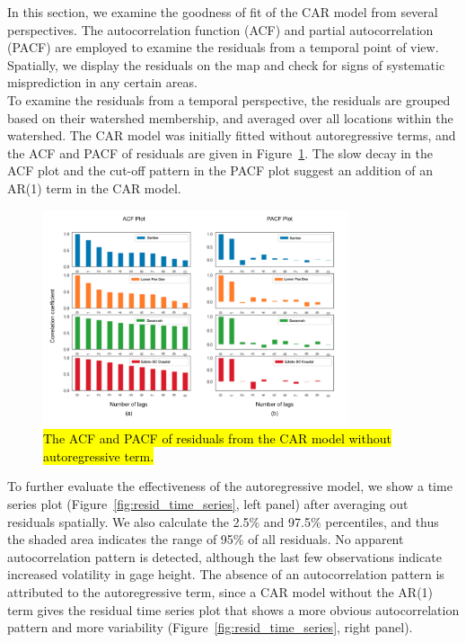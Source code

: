 In this section, we examine the goodness of fit of the CAR model from several perspectives.
The autocorrelation function (ACF) and partial autocorrelation (PACF) are employed to examine the residuals from a temporal point of view.
Spatially, we display the residuals on the map and check for signs of systematic misprediction in any certain areas.  \\

To examine the residuals from a temporal perspective, the residuals are grouped based on their watershed membership, and averaged over all locations within the watershed.
The CAR model was initially fitted without autoregressive terms, and the ACF and PACF of residuals are given in Figure~\ref{fig:ACF_and_PACF}.
The  slow decay in the ACF plot and the cut-off pattern in the PACF plot suggest an addition of an AR(1) term in the CAR model.\\

\begin{figure}[htbp]
\begin{center}
\includegraphics[width=0.8\textwidth]{../images/acf_and_pacf_for_residuals.png}
\caption{\hl{The ACF and PACF of residuals from the CAR model without autoregressive term.}}
\label{fig:ACF_and_PACF}
\end{center}
\end{figure}

To further evaluate the effectiveness of the autoregressive model, we show a time series plot (Figure~\ref{fig:resid_time_series}, left panel) after averaging out residuals spatially.
We also calculate the 2.5\% and 97.5\% percentiles, and thus the shaded area indicates the range of 95\% of all residuals.
 No apparent autocorrelation pattern is detected, although the last few  observations indicate increased volatility in  gage height.
 The absence of an autocorrelation pattern is attributed to the autoregressive term, since a  CAR model without the AR(1) term gives the residual time series plot that shows a more obvious autocorrelation  pattern and more variability (Figure~\ref{fig:resid_time_series}, right panel).\\

